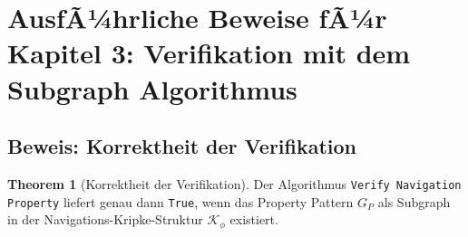 ﻿\documentclass[a4paper,12pt]{article}
\theoremstyle{definition}
\newtheorem{theorem}{Theorem}[section]
\begin{document}
\newpage

\section{AusfÃ¼hrliche Beweise fÃ¼r Kapitel 3: Verifikation mit dem Subgraph Algorithmus}

\subsection{Beweis: Korrektheit der Verifikation}

\begin{theorem}[Korrektheit der Verifikation]
Der Algorithmus \texttt{Verify Navigation Property} liefert genau dann \texttt{True}, wenn das Property Pattern $G_P$ als Subgraph in der Navigations-Kripke-Struktur $\mathcal{K}_{\phi}$ existiert.
\end{theorem}
\end{document}
